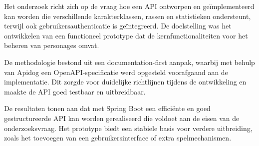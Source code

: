 Het onderzoek richt zich op de vraag hoe een API ontworpen en geïmplementeerd kan worden die verschillende karakterklassen, rassen en statistieken ondersteunt, terwijl ook gebruikersauthenticatie is geïntegreerd. De doelstelling was het ontwikkelen van een functioneel prototype dat de kernfunctionaliteiten voor het beheren van personages omvat.

De methodologie bestond uit een documentation-first aanpak, waarbij met behulp van Apidog een OpenAPI-specificatie werd opgesteld voorafgaand aan de implementatie. Dit zorgde voor duidelijke richtlijnen tijdens de ontwikkeling en maakte de API goed testbaar en uitbreidbaar.

De resultaten tonen aan dat met Spring Boot een efficiënte en goed gestructureerde API kan worden gerealiseerd die voldoet aan de eisen van de onderzoeksvraag. Het prototype biedt een stabiele basis voor verdere uitbreiding, zoals het toevoegen van een gebruikersinterface of extra spelmechanismen.
